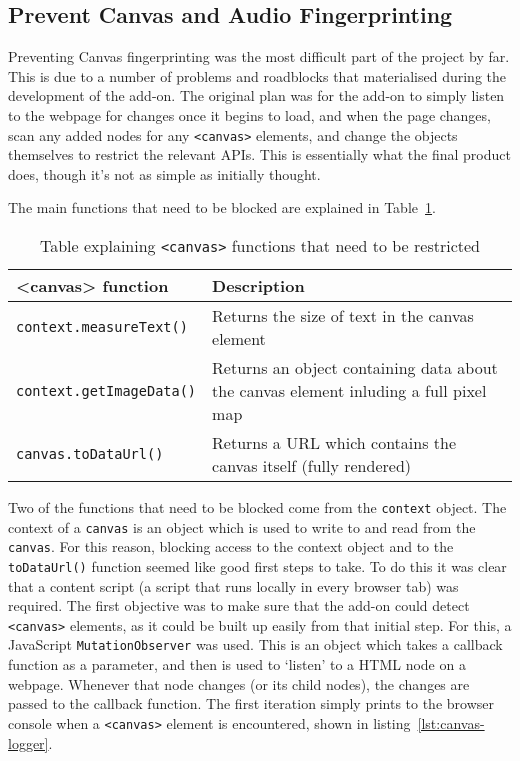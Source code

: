 \subsection{Prevent Canvas and Audio Fingerprinting}

Preventing Canvas fingerprinting was the most difficult part of the project by far.
This is due to a number of problems and roadblocks that materialised during the development of the add-on.
The original plan was for the add-on to simply listen to the webpage for changes once it begins to load, and when the page changes, scan any added nodes for any \texttt{<canvas>} elements, and change the objects themselves to restrict the relevant APIs.
This is essentially what the final product does, though it's not as simple as initially thought.

The main functions that need to be blocked are explained in Table~\ref{tab:canvas-methods}.

\begin{table}[h!]
\centering
\begin{tabular}{| p{6cm} | p{8cm} |}
    \hline
    \textbf{<canvas> function} & \textbf{Description} \\ \hline
    \texttt{context.measureText()} & {Returns the size of text in the canvas element} \\ \hline
    \texttt{context.getImageData()} & {Returns an object containing data about \newline the canvas element inluding a full pixel map} \\ \hline
    \texttt{canvas.toDataUrl()} & {Returns a URL which contains the canvas \newline itself (fully rendered)} \\
    \hline
\end{tabular}
\caption{Table explaining \texttt{<canvas>} functions that need to be restricted}
\label{tab:canvas-methods}
\end{table}

Two of the functions that need to be blocked come from the \texttt{context} object.
The context of a \texttt{canvas} is an object which is used to write to and read from the \texttt{canvas}.
For this reason, blocking access to the context object and to the \texttt{toDataUrl()} function seemed like good first steps to take.
To do this it was clear that a content script (a script that runs locally in every browser tab) was required.
The first objective was to make sure that the add-on could detect \texttt{<canvas>} elements, as it could be built up easily from that initial step.
For this, a JavaScript \texttt{MutationObserver} was used.
This is an object which takes a callback function as a parameter, and then is used to `listen' to a HTML node on a webpage.
Whenever that node changes (or its child nodes), the changes are passed to the callback function.
The first iteration simply prints to the browser console when a \texttt{<canvas>} element is encountered, shown in listing~\ref{lst:canvas-logger}.

